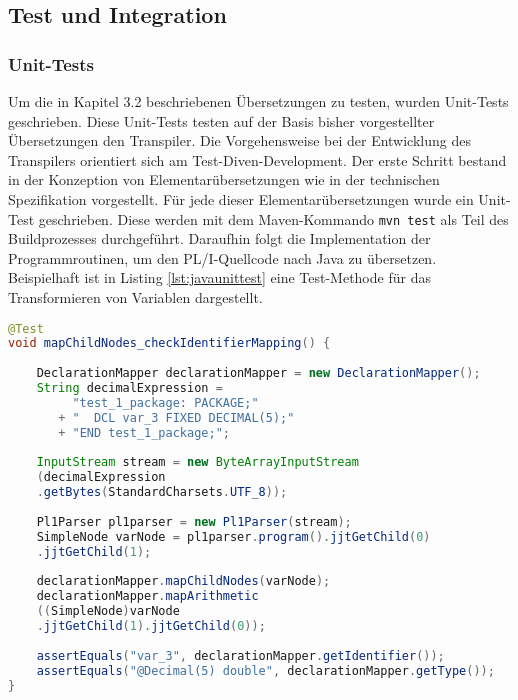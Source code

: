 \pagebreak
\subsection{Test und Integration}
\subsubsection{Unit-Tests}

Um die in Kapitel 3.2 beschriebenen Übersetzungen zu testen, wurden Unit-Tests geschrieben. 
Diese Unit-Tests testen auf der Basis bisher vorgestellter Übersetzungen den Transpiler. Die Vorgehensweise bei der Entwicklung des Transpilers orientiert sich am Test-Diven-Development. 
Der erste Schritt bestand in der Konzeption von Elementarübersetzungen wie in der technischen Spezifikation vorgestellt.
Für jede dieser Elementarübersetzungen wurde ein Unit-Test geschrieben. Diese werden mit dem Maven-Kommando \verb+mvn test+ als Teil des Buildprozesses durchgeführt. Daraufhin folgt die Implementation der Programmroutinen, um den PL/I-Quellcode nach Java zu übersetzen.
Beispielhaft ist in Listing \ref{lst:javaunittest} eine Test-Methode für das Transformieren von Variablen dargestellt.

\begin{lstlisting}[language=Java, caption=Positv-Test für die Übersetzung eines Arithmetischen Ausdrucks, label={lst:javaunittest}]
@Test
void mapChildNodes_checkIdentifierMapping() {
	
	DeclarationMapper declarationMapper = new DeclarationMapper();
	String decimalExpression = 
		 "test_1_package: PACKAGE;" 
	   + "	DCL var_3 FIXED DECIMAL(5);" 
	   + "END test_1_package;";
	
	InputStream stream = new ByteArrayInputStream
	(decimalExpression
	.getBytes(StandardCharsets.UTF_8));
	
	Pl1Parser pl1parser = new Pl1Parser(stream);
	SimpleNode varNode = pl1parser.program().jjtGetChild(0)
	.jjtGetChild(1);
		
	declarationMapper.mapChildNodes(varNode);
	declarationMapper.mapArithmetic
	((SimpleNode)varNode
	.jjtGetChild(1).jjtGetChild(0));
		
	assertEquals("var_3", declarationMapper.getIdentifier());
	assertEquals("@Decimal(5) double", declarationMapper.getType());
}
\end{lstlisting} 

